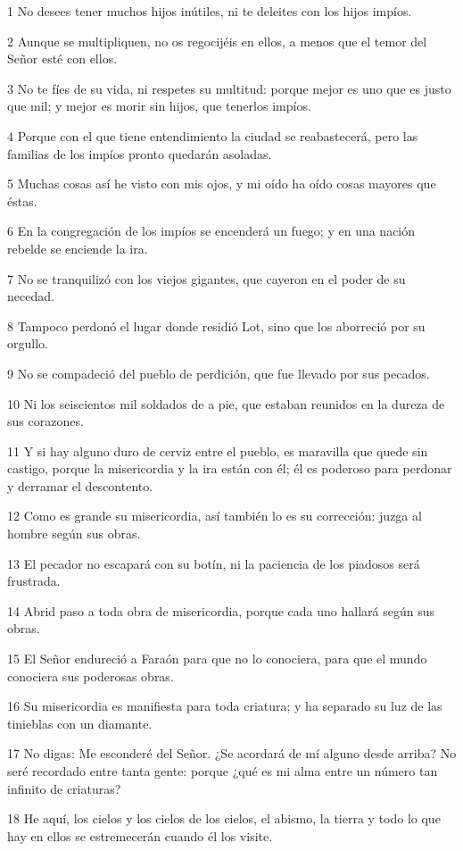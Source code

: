 \par 1 No desees tener muchos hijos inútiles, ni te deleites con los hijos impíos.
\par 2 Aunque se multipliquen, no os regocijéis en ellos, a menos que el temor del Señor esté con ellos.
\par 3 No te fíes de su vida, ni respetes su multitud: porque mejor es uno que es justo que mil; y mejor es morir sin hijos, que tenerlos impíos.
\par 4 Porque con el que tiene entendimiento la ciudad se reabastecerá, pero las familias de los impíos pronto quedarán asoladas.
\par 5 Muchas cosas así he visto con mis ojos, y mi oído ha oído cosas mayores que éstas.
\par 6 En la congregación de los impíos se encenderá un fuego; y en una nación rebelde se enciende la ira.
\par 7 No se tranquilizó con los viejos gigantes, que cayeron en el poder de su necedad.
\par 8 Tampoco perdonó el lugar donde residió Lot, sino que los aborreció por su orgullo.
\par 9 No se compadeció del pueblo de perdición, que fue llevado por sus pecados.
\par 10 Ni los seiscientos mil soldados de a pie, que estaban reunidos en la dureza de sus corazones.
\par 11 Y si hay alguno duro de cerviz entre el pueblo, es maravilla que quede sin castigo, porque la misericordia y la ira están con él; él es poderoso para perdonar y derramar el descontento.
\par 12 Como es grande su misericordia, así también lo es su corrección: juzga al hombre según sus obras.
\par 13 El pecador no escapará con su botín, ni la paciencia de los piadosos será frustrada.
\par 14 Abrid paso a toda obra de misericordia, porque cada uno hallará según sus obras.
\par 15 El Señor endureció a Faraón para que no lo conociera, para que el mundo conociera sus poderosas obras.
\par 16 Su misericordia es manifiesta para toda criatura; y ha separado su luz de las tinieblas con un diamante.
\par 17 No digas: Me esconderé del Señor. ¿Se acordará de mí alguno desde arriba? No seré recordado entre tanta gente: porque ¿qué es mi alma entre un número tan infinito de criaturas?
\par 18 He aquí, los cielos y los cielos de los cielos, el abismo, la tierra y todo lo que hay en ellos se estremecerán cuando él los visite.
